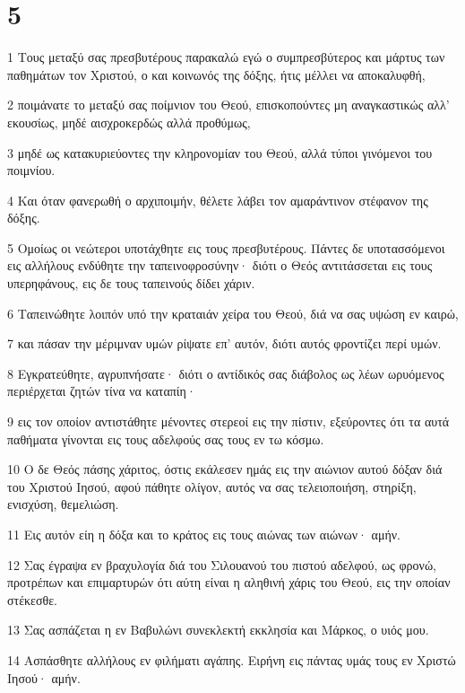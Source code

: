 \chapter{5}

\par 1 Τους μεταξύ σας πρεσβυτέρους παρακαλώ εγώ ο συμπρεσβύτερος και μάρτυς των παθημάτων τον Χριστού, ο και κοινωνός της δόξης, ήτις μέλλει να αποκαλυφθή,
\par 2 ποιμάνατε το μεταξύ σας ποίμνιον του Θεού, επισκοπούντες μη αναγκαστικώς αλλ' εκουσίως, μηδέ αισχροκερδώς αλλά προθύμως,
\par 3 μηδέ ως κατακυριεύοντες την κληρονομίαν του Θεού, αλλά τύποι γινόμενοι του ποιμνίου.
\par 4 Και όταν φανερωθή ο αρχιποιμήν, θέλετε λάβει τον αμαράντινον στέφανον της δόξης.
\par 5 Ομοίως οι νεώτεροι υποτάχθητε εις τους πρεσβυτέρους. Πάντες δε υποτασσόμενοι εις αλλήλους ενδύθητε την ταπεινοφροσύνην· διότι ο Θεός αντιτάσσεται εις τους υπερηφάνους, εις δε τους ταπεινούς δίδει χάριν.
\par 6 Ταπεινώθητε λοιπόν υπό την κραταιάν χείρα του Θεού, διά να σας υψώση εν καιρώ,
\par 7 και πάσαν την μέριμναν υμών ρίψατε επ' αυτόν, διότι αυτός φροντίζει περί υμών.
\par 8 Εγκρατεύθητε, αγρυπνήσατε· διότι ο αντίδικός σας διάβολος ως λέων ωρυόμενος περιέρχεται ζητών τίνα να καταπίη·
\par 9 εις τον οποίον αντιστάθητε μένοντες στερεοί εις την πίστιν, εξεύροντες ότι τα αυτά παθήματα γίνονται εις τους αδελφούς σας τους εν τω κόσμω.
\par 10 Ο δε Θεός πάσης χάριτος, όστις εκάλεσεν ημάς εις την αιώνιον αυτού δόξαν διά του Χριστού Ιησού, αφού πάθητε ολίγον, αυτός να σας τελειοποιήση, στηρίξη, ενισχύση, θεμελιώση.
\par 11 Εις αυτόν είη η δόξα και το κράτος εις τους αιώνας των αιώνων· αμήν.
\par 12 Σας έγραψα εν βραχυλογία διά του Σιλουανού του πιστού αδελφού, ως φρονώ, προτρέπων και επιμαρτυρών ότι αύτη είναι η αληθινή χάρις του Θεού, εις την οποίαν στέκεσθε.
\par 13 Σας ασπάζεται η εν Βαβυλώνι συνεκλεκτή εκκλησία και Μάρκος, ο υιός μου.
\par 14 Ασπάσθητε αλλήλους εν φιλήματι αγάπης. Ειρήνη εις πάντας υμάς τους εν Χριστώ Ιησού· αμήν.


